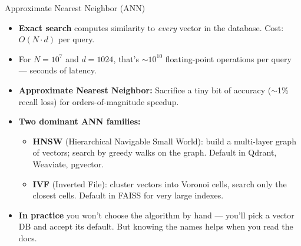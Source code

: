 \begin{frame}{Approximate Nearest Neighbor (ANN)}
\begin{itemize}
\item \textbf{Exact search} computes similarity to \emph{every} vector in the database. Cost: $O(N \cdot d)$ per query.

\medskip
\item For $N = 10^7$ and $d = 1024$, that's $\sim$$10^{10}$ floating-point operations per query --- seconds of latency.

\medskip
\item \textbf{Approximate Nearest Neighbor:} Sacrifice a tiny bit of accuracy ($\sim$1\% recall loss) for orders-of-magnitude speedup.

\medskip
\item \textbf{Two dominant ANN families:}
\begin{itemize}
    \item \textbf{HNSW} (Hierarchical Navigable Small World): build a multi-layer graph of vectors; search by greedy walks on the graph. Default in Qdrant, Weaviate, pgvector.
    \item \textbf{IVF} (Inverted File): cluster vectors into Voronoi cells, search only the closest cells. Default in FAISS for very large indexes.
\end{itemize}

\medskip
\item \textbf{In practice} you won't choose the algorithm by hand --- you'll pick a vector DB and accept its default. But knowing the names helps when you read the docs.
\end{itemize}
\end{frame}

